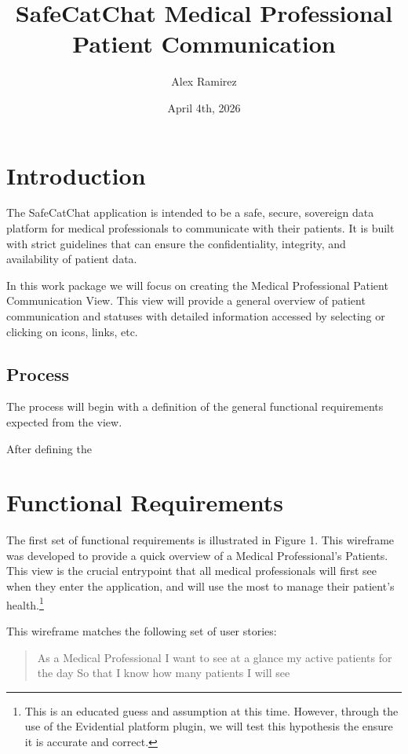 \documentclass{article}
\title{SafeCatChat \- Medical Professional Patient Communication}
\author{Alex Ramirez}
\date{April 4th, 2026}
\begin{document}
\maketitle

\tableofcontents

\section{Introduction}

The SafeCatChat application is intended to be a safe, secure, sovereign data platform
for medical professionals to communicate with their patients.  It is built with strict 
guidelines that can ensure the confidentiality, integrity, and availability of patient
data.

In this work package we will focus on creating the Medical Professional Patient Communication
View.  This view will provide a general overview of patient communication and statuses with
detailed information accessed by selecting or clicking on icons, links, etc.

\subsection{Process}

The process will begin with a definition of the general functional requirements expected
from the view.

After defining the 

\section{Functional Requirements}

The first set of functional requirements is illustrated in Figure 1.  
This wireframe was developed to provide a quick overview of a Medical Professional's 
Patients.  This view is the crucial entrypoint that all medical professionals will 
first see when they enter the application, and will use the most to manage their 
patient's health.\footnote{This is an educated guess and assumption at this time.  However, through the use of the Evidential platform plugin, we will test this hypothesis the ensure it is accurate and correct.}

This wireframe matches the following set of user stories:

\begin{quote}
    As a Medical Professional 
    I want to see at a glance my active patients for the day
    So that I know how many patients I will see
\end{quote}
\end{document}
